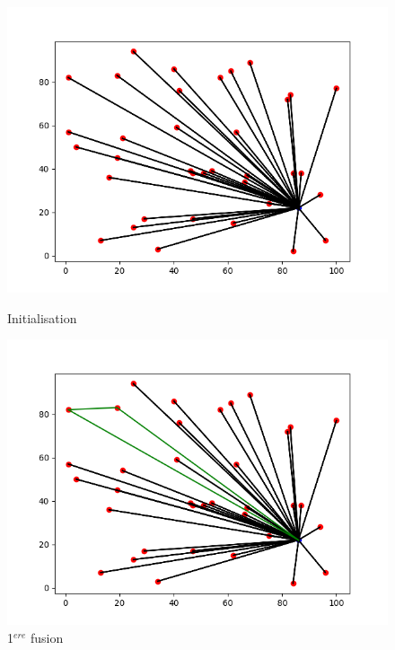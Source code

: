 \documentclass[a4paper,11pt]{article}%
\begin{document}
\begin{figure}
\begin{center}




  	\includegraphics[scale=0.4]{CWinit.png}
  	\caption{Initialisation}
	\label{CWinit}
	
  
  
	\includegraphics[scale=0.4]{CW1.png}
	\caption{1$^{ere}$ fusion}
 	\label{CW1}
  	



\end{center}
\end{figure}
\end{document}
